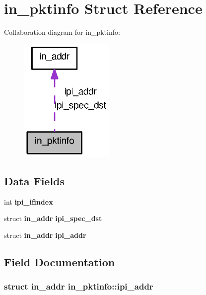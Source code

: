 \section{in\_\-pktinfo Struct Reference}
\label{structin__pktinfo}


Collaboration diagram for in\_\-pktinfo:
\nopagebreak
\begin{figure}[H]
\begin{center}
\leavevmode
\includegraphics[width=128pt]{structin__pktinfo__coll__graph}
\end{center}
\end{figure}
\subsection*{Data Fields}
\begin{DoxyCompactItemize}
\item 
int {\bf ipi\_\-ifindex}
\item 
struct {\bf in\_\-addr} {\bf ipi\_\-spec\_\-dst}
\item 
struct {\bf in\_\-addr} {\bf ipi\_\-addr}
\end{DoxyCompactItemize}


\subsection{Field Documentation}
\subsubsection[{ipi\_\-addr}]{\setlength{\rightskip}{0pt plus 5cm}struct {\bf in\_\-addr} {\bf in\_\-pktinfo::ipi\_\-addr}}\label{structin__pktinfo_a51f86ad8ba1e3c209fb6c8d9572b08c6}
